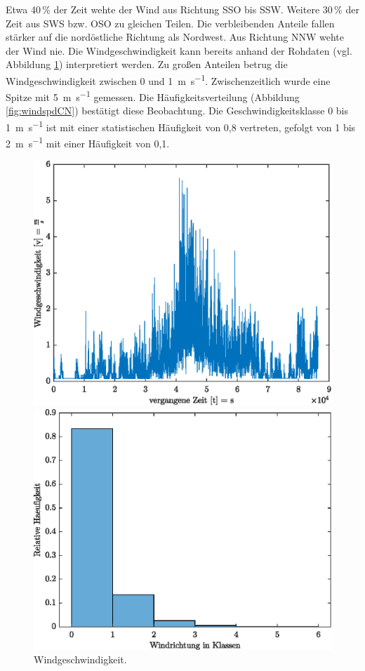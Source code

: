Etwa 40\,\% der Zeit wehte der Wind aus Richtung SSO bis SSW. Weitere 30\,\% der Zeit aus SWS bzw. OSO zu gleichen Teilen. Die verbleibenden Anteile fallen stärker auf die nordöstliche Richtung als Nordwest. Aus Richtung NNW wehte der Wind nie. Die Windgeschwindigkeit kann bereits anhand der Rohdaten (vgl. Abbildung \ref{fig:windspd}) interpretiert werden. Zu großen Anteilen betrug die Windgeschwindigkeit zwischen 0 und \SI{1}{\meter\per\second}. Zwischenzeitlich wurde eine Spitze mit \SI{5}{\meter\per\second} gemessen. Die Häufigkeitsverteilung (Abbildung \ref{fig:windspdCN}) bestätigt diese Beobachtung. Die Geschwindigkeitsklasse 0 bis \SI{1}{\meter\per\second} ist mit einer statistischen Häufigkeit von 0,8 vertreten, gefolgt von 1 bis \SI{2}{\meter\per\second} mit einer Häufigkeit von 0,1.
\begin{figure}[H]
	\centering
	\begin{minipage}[t]{0.4\textwidth}
	\centering
	\includegraphics[width=\textwidth]{../DATA/Windgeschwindigkeit.eps}
	\caption[Windgeschwindigkeit]{Windgeschwindigkeit.}
	\label{fig:windspd}
	\end{minipage}
\hfill
	\begin{minipage}[t]{0.4\textwidth}
	\centering
	\includegraphics[width=\textwidth]{../DATA/WindspdCN.eps}

\end{minipage}
\end{figure}
